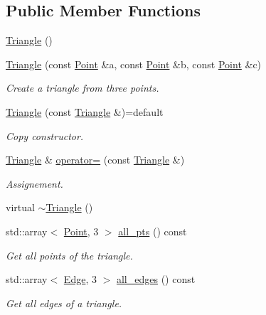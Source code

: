 \subsection*{Public Member Functions}
\begin{DoxyCompactItemize}
\item 
\hyperlink{classTspeed_1_1Geo_1_1Triangle_a96ea06e6dbd9b707184c5e22d305e6e6}{Triangle} ()
\item 
\hyperlink{classTspeed_1_1Geo_1_1Triangle_a06a3c8a78d0e633b48df2a62db82e1cf}{Triangle} (const \hyperlink{classTspeed_1_1Geo_1_1Point}{Point} \&a, const \hyperlink{classTspeed_1_1Geo_1_1Point}{Point} \&b, const \hyperlink{classTspeed_1_1Geo_1_1Point}{Point} \&c)
\begin{DoxyCompactList}\small\item\em Create a triangle from three points. \end{DoxyCompactList}\item 
\hyperlink{classTspeed_1_1Geo_1_1Triangle_a3688a8a85846b3262366267d85e80d5a}{Triangle} (const \hyperlink{classTspeed_1_1Geo_1_1Triangle}{Triangle} \&)=default
\begin{DoxyCompactList}\small\item\em Copy constructor. \end{DoxyCompactList}\item 
\hyperlink{classTspeed_1_1Geo_1_1Triangle}{Triangle} \& \hyperlink{classTspeed_1_1Geo_1_1Triangle_a38b03bcff96b6ed334d381d56507c91d}{operator=} (const \hyperlink{classTspeed_1_1Geo_1_1Triangle}{Triangle} \&)
\begin{DoxyCompactList}\small\item\em Assignement. \end{DoxyCompactList}\item 
virtual \hyperlink{classTspeed_1_1Geo_1_1Triangle_af195c8c8c367a11fa9dc95f4a4ef8898}{$\sim$\-Triangle} ()
\item 
std\-::array$<$ \hyperlink{classTspeed_1_1Geo_1_1Point}{Point}, 3 $>$ \hyperlink{classTspeed_1_1Geo_1_1Triangle_a5749a0b4d9cec7c73fdfa13904ab04c6}{all\-\_\-pts} () const 
\begin{DoxyCompactList}\small\item\em Get all points of the triangle. \end{DoxyCompactList}\item 
std\-::array$<$ \hyperlink{classTspeed_1_1Geo_1_1Edge}{Edge}, 3 $>$ \hyperlink{classTspeed_1_1Geo_1_1Triangle_a95aad39ebd133e7fc23fd6a2431c601e}{all\-\_\-edges} () const 
\begin{DoxyCompactList}\small\item\em Get all edges of a triangle. \end{DoxyCompactList}\item 

\end{DoxyCompactItemize}

